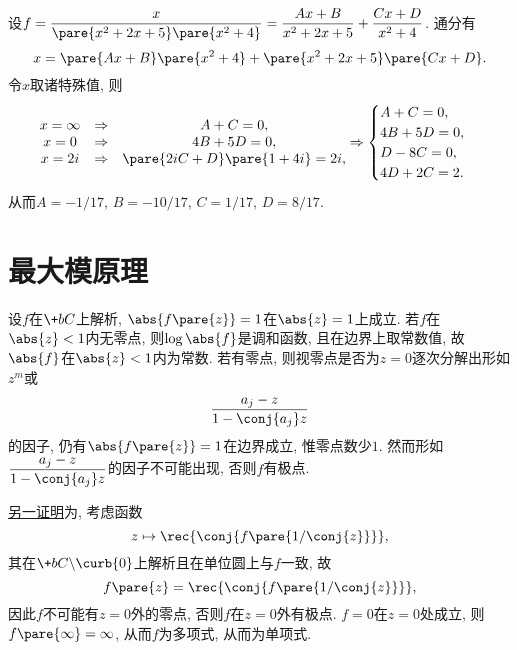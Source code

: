 \documentclass{ctexart}
\begin{document}
\begin{sample}
    \begin{ex}
        设$\displaystyle f = \frac{x}{\pare{x^2+2x+5}\pare{x^2+4}} = \frac{Ax+B}{x^2+2x+5} + \frac{Cx+D}{x^2+4}$. 通分有
        \[ x = \pare{Ax+B}\pare{x^2+4} + \pare{x^2+2x+5}\pare{Cx+D}. \]
        令$x$取诸特殊值, 则
        \[ \begin{matrix}
            x=\infty & \Rightarrow & A+C = 0, \\
            x=0 & \Rightarrow & 4B+5D = 0, \\
            x=2i & \Rightarrow & \pare{2iC+D}\pare{1+4i} = 2i,
        \end{matrix} \Rightarrow \begin{cases}
            A+C = 0, \\
            4B + 5D = 0,\\
            D - 8C = 0,\\ 4D + 2C = 2.
        \end{cases} \]
        从而$A = -1/17$, $B = -10/17$, $C = 1/17$, $D = 8/17$.
    \end{ex}
\end{sample}


\section{最大模原理} %
\label{sec:最大模原理}

\begin{sample}
    \begin{ex}
        设$f$在$\+bC$上解析, $\abs{f\pare{z}} = 1$在$\abs{z} = 1$上成立. 若$f$在$\abs{z}<1$内无零点, 则$\log\abs{f}$是调和函数, 且在边界上取常数值, 故$\abs{f}$在$\abs{z}<1$内为常数. 若有零点, 则视零点是否为$z=0$逐次分解出形如$z^m$或
        \[ \frac{a_j - z}{1-\conj{a_j}z} \]
        的因子, 仍有$\abs{f\pare{z}} = 1$在边界成立, 惟零点数少$1$. 然而形如$\displaystyle \frac{a_j - z}{1-\conj{a_j}z}$的因子不可能出现, 否则$f$有极点.
    \end{ex}
    \begin{ex}
        \href{https://math.stackexchange.com/questions/626488/find-all-entire-functions-fz-such-that-fz-1-for-z-1}{另一证明}为, 考虑函数
        \[ z\mapsto \rec{\conj{f\pare{1/\conj{z}}}}, \]
        其在$\+bC\backslash\curb{0}$上解析且在单位圆上与$f$一致, 故
        \[ f\pare{z} = \rec{\conj{f\pare{1/\conj{z}}}}, \]
        因此$f$不可能有$z=0$外的零点, 否则$f$在$z=0$外有极点. $f=0$在$z=0$处成立, 则$f\pare{\infty} = \infty$, 从而$f$为多项式, 从而为单项式.
    \end{ex}
\end{sample}

\end{document}
